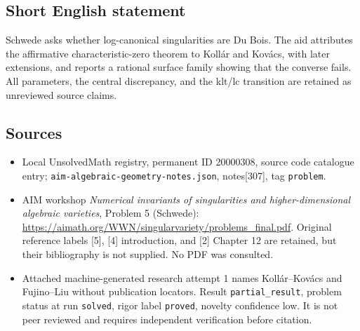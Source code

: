\documentclass[11pt]{article}
\begin{document}
\subsection{Short English statement}
Schwede asks whether log-canonical singularities are Du Bois. The aid attributes the affirmative characteristic-zero theorem to Kollár and Kovács, with later extensions, and reports a rational surface family showing that the converse fails. All parameters, the central discrepancy, and the klt/lc transition are retained as unreviewed source claims.
\subsection{Sources}
\begin{itemize}
\item Local UnsolvedMath registry, permanent ID 20000308, source code catalogue entry; \texttt{aim-algebraic-geometry-notes.json}, notes[307], tag \texttt{problem}.
\item AIM workshop \emph{Numerical invariants of singularities and higher-dimensional algebraic varieties}, Problem 5 (Schwede): \url{https://aimath.org/WWN/singularvariety/problems_final.pdf}. Original reference labels [5], [4] introduction, and [2] Chapter 12 are retained, but their bibliography is not supplied. No PDF was consulted.
\item Attached machine-generated research attempt 1 names Kollár--Kovács and Fujino--Liu without publication locators. Result \texttt{partial\_result}, problem status at run \texttt{solved}, rigor label \texttt{proved}, novelty confidence low. It is not peer reviewed and requires independent verification before citation.
\end{itemize}
\end{document}
